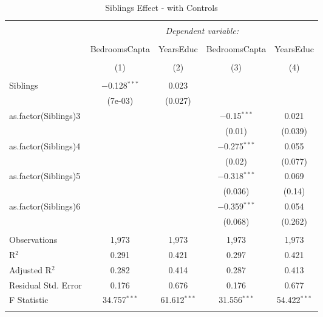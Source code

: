 
\begin{table}[H] \centering 
  \caption{Siblings Effect - with Controls} 
  \label{} 
\begin{tabular}{@{\extracolsep{5pt}}lcccc} 
\\[-1.8ex]\hline 
\hline \\[-1.8ex] 
 & \multicolumn{4}{c}{\textit{Dependent variable:}} \\ 
\cline{2-5} 
\\[-1.8ex] & BedroomsCapta & YearsEduc & BedroomsCapta & YearsEduc \\ 
\\[-1.8ex] & (1) & (2) & (3) & (4)\\ 
\hline \\[-1.8ex] 
 Siblings & $-$0.128$^{***}$ & 0.023 &  &  \\ 
  & (7e-03) & (0.027) &  &  \\ 
  as.factor(Siblings)3 &  &  & $-$0.15$^{***}$ & 0.021 \\ 
  &  &  & (0.01) & (0.039) \\ 
  as.factor(Siblings)4 &  &  & $-$0.275$^{***}$ & 0.055 \\ 
  &  &  & (0.02) & (0.077) \\ 
  as.factor(Siblings)5 &  &  & $-$0.318$^{***}$ & 0.069 \\ 
  &  &  & (0.036) & (0.14) \\ 
  as.factor(Siblings)6 &  &  & $-$0.359$^{***}$ & 0.054 \\ 
  &  &  & (0.068) & (0.262) \\ 
 \hline \\[-1.8ex] 
Observations & 1,973 & 1,973 & 1,973 & 1,973 \\ 
R$^{2}$ & 0.291 & 0.421 & 0.297 & 0.421 \\ 
Adjusted R$^{2}$ & 0.282 & 0.414 & 0.287 & 0.413 \\ 
Residual Std. Error & 0.176 & 0.676 & 0.176 & 0.677 \\ 
F Statistic & 34.757$^{***}$ & 61.612$^{***}$ & 31.556$^{***}$ & 54.422$^{***}$ \\ 
\hline 
\hline \\[-1.8ex] 
\end{tabular} 
\end{table} 
